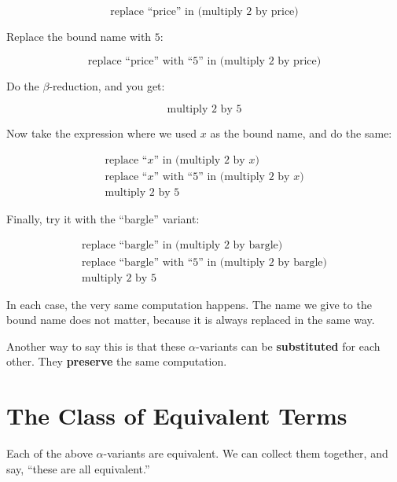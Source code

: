 \documentclass{book}
\numberwithin{equation}{chapter}
\newcommand{\vocab}{\textbf}
\begin{document}
\begin{equation}
\text{replace ``price'' in (multiply 2 by price)}
\end{equation}

\noindent
Replace the bound name with $5$:

\begin{equation}
\text{replace ``price'' with ``5'' in (multiply 2 by price)}
\end{equation}

\noindent
Do the $\beta$-reduction, and you get:

\begin{equation}
\text{multiply 2 by 5}
\end{equation}

\noindent
Now take the expression where we used $x$ as the bound name, and do the same:

\begin{align}
\text{replace ``$x$'' in (multiply 2 by $x$)} \\
\text{replace ``$x$'' with ``5'' in (multiply 2 by $x$)} \\
\text{multiply 2 by 5}
\end{align}

\noindent
Finally, try it with the ``bargle'' variant:

\begin{align}
\text{replace ``bargle'' in (multiply 2 by bargle)} \\
\text{replace ``bargle'' with ``5'' in (multiply 2 by bargle)} \\
\text{multiply 2 by 5}
\end{align}

\noindent
In each case, the very same computation happens. The name we give to the bound name does not matter, because it is always replaced in the same way.

Another way to say this is that these $\alpha$-variants can be \vocab{substituted} for each other. They \vocab{preserve} the same computation.


\section{The Class of Equivalent Terms}

Each of the above $\alpha$-variants are equivalent. We can collect them together, and say, ``these are all equivalent.'' 
\end{document}
